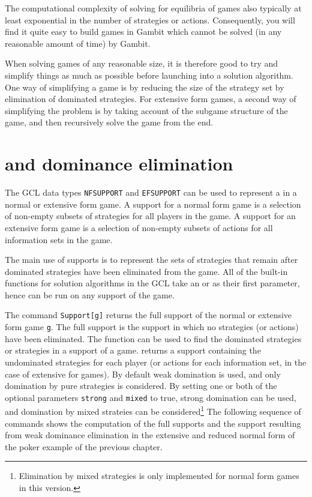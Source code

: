 The computational complexity of solving for equilibria of games also
typically at least exponential in the number of strategies or actions.
Consequently, you will find it quite easy to build games in Gambit
which cannot be solved (in any reasonable amount of time) by Gambit.

When solving games of any reasonable size, it is therefore good to try
and simplify things as much as possible before launching into a
solution algorithm.  One way of simplifying a game is by reducing the
size of the strategy set by elimination of dominated strategies.  For
extensive form games, a second way of simplifying the problem is by
taking account of the subgame structure of the game, and then
recursively solve the game from the end.

\section{ and dominance elimination}

The GCL data types \verb+NFSUPPORT+ and \verb+EFSUPPORT+ can be used
to represent a  in a normal or extensive form game.  A
support for a normal form game is a selection of non-empty subsets of
strategies for all players in the game.  A support for an extensive
form game is a selection of non-empty subsets of actions for all
information sets in the game.

The main use of supports is to represent the sets of strategies that
remain after dominated strategies have been eliminated from the game.
All of the built-in functions for solution algorithms in the GCL take
an  or  as their first parameter,
hence can be run on any support of the game.

The command \verb+Support[g]+ returns the full support
of the normal or extensive form game \verb+g+.  The full support is
the support in which no strategies (or actions) have been eliminated.
The function  can be used to find the dominated
strategies or strategies in a support of a game.  
returns a support containing the undominated strategies for each
player (or actions for each information set, in the case of extensive
for games).  By default weak domination is used, and only domination
by pure strategies is considered. By setting one or both of the
optional parameters \verb+strong+ and \verb+mixed+ to true, strong
domination can be used, and domination by mixed strateies can be
considered\footnote{Elimination by mixed strategies is only
implemented for normal form games in this version.}  The following
sequence of commands shows the computation of the full supports and
the support resulting from weak dominance elimination in the extensive
and reduced normal form of the poker example of the previous chapter.

